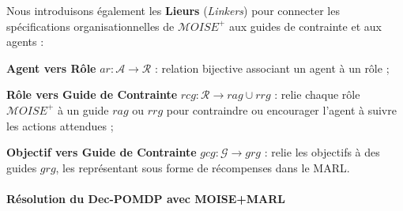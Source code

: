 \documentclass[pdflatex,sn-mathphys-num]{sn-jnl}%
\theoremstyle{thmstyleone}%
\theoremstyle{thmstyletwo}%
\theoremstyle{thmstylethree}%
\begin{document}
\vspace{0.8em}

\noindent Nous introduisons également les \textbf{Lieurs} (\textit{Linkers}) pour connecter les spécifications organisationnelles de $\mathcal{M}OISE^+$ aux guides de contrainte et aux agents :

\begin{enumerate*}[label={\roman*) },itemjoin={; \quad}]
    \item \textbf{Agent vers Rôle} \quad $ar: \mathcal{A} \to \mathcal{R}$ : relation bijective associant un agent à un rôle ;
    
    \item \textbf{Rôle vers Guide de Contrainte} \quad $rcg: \mathcal{R} \rightarrow rag \cup rrg$ : relie chaque rôle $\mathcal{M}OISE^+$ à un guide $rag$ ou $rrg$ pour contraindre ou encourager l'agent à suivre les actions attendues ;
    
    \item \textbf{Objectif vers Guide de Contrainte} \quad $gcg: \mathcal{G} \rightarrow grg$ : relie les objectifs à des guides $grg$, les représentant sous forme de récompenses dans le MARL.
\end{enumerate*}

\paragraph{\textbf{Résolution du Dec-POMDP avec MOISE+MARL}}
\end{document}
